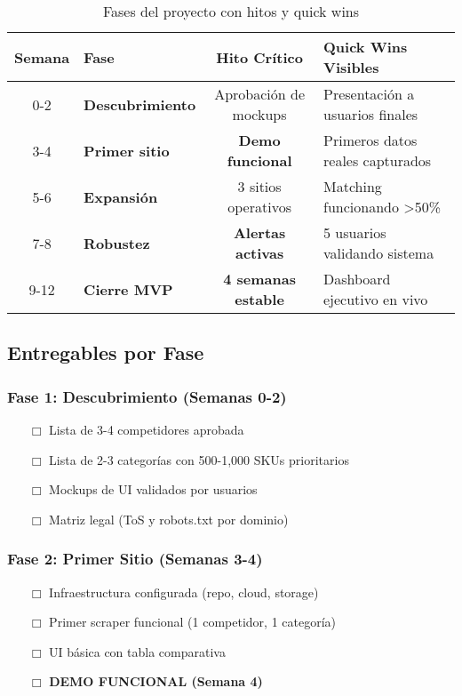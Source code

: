 \documentclass[12pt,a4paper]{article}
\begin{document}
\begin{table}[h]
\centering
\small
\begin{tabularx}{\textwidth}{|c|X|c|X|}
\hline
\rowcolor{lightgray}
\textbf{Semana} & \textbf{Fase} & \textbf{Hito Crítico} & \textbf{Quick Wins Visibles} \\
\hline
0-2 & \textbf{Descubrimiento} & Aprobación de mockups & Presentación a usuarios finales \\
\hline
3-4 & \textbf{Primer sitio} & \cellcolor{successgreen!30}\textbf{Demo funcional} & Primeros datos reales capturados \\
\hline
5-6 & \textbf{Expansión} & 3 sitios operativos & Matching funcionando >50\% \\
\hline
7-8 & \textbf{Robustez} & \cellcolor{primaryblue!30}\textbf{Alertas activas} & 5 usuarios validando sistema \\
\hline
9-12 & \textbf{Cierre MVP} & \cellcolor{successgreen!30}\textbf{4 semanas estable} & Dashboard ejecutivo en vivo \\
\hline
\end{tabularx}
\caption{Fases del proyecto con hitos y quick wins}
\end{table}

\subsection{Entregables por Fase}

\subsubsection*{Fase 1: Descubrimiento (Semanas 0-2)}
\begin{itemize}[leftmargin=*]
    \item[$\Box$] Lista de 3-4 competidores aprobada
    \item[$\Box$] Lista de 2-3 categorías con 500-1,000 SKUs prioritarios
    \item[$\Box$] Mockups de UI validados por usuarios
    \item[$\Box$] Matriz legal (ToS y robots.txt por dominio)
\end{itemize}

\subsubsection*{Fase 2: Primer Sitio (Semanas 3-4)}
\begin{itemize}[leftmargin=*]
    \item[$\Box$] Infraestructura configurada (repo, cloud, storage)
    \item[$\Box$] Primer scraper funcional (1 competidor, 1 categoría)
    \item[$\Box$] UI básica con tabla comparativa
    \item[$\Box$] \textcolor{successgreen}{\textbf{DEMO FUNCIONAL (Semana 4)}}
\end{itemize}
\end{document}
